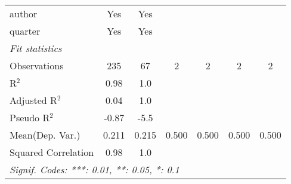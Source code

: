 \begin{tabular}{lcccccc}
   author                        & Yes           & Yes            &     &     &     & \\  
   quarter                       & Yes           & Yes            &     &     &     & \\  
   \midrule
   \emph{Fit statistics}\\
   Observations                  & 235           & 67             & 2   & 2   & 2   & 2\\  
   R$^2$                         & 0.98          & 1.0            &     &     &     & \\  
   Adjusted R$^2$                & 0.04          & 1.0            &     &     &     & \\  
   Pseudo R$^2$                  & -0.87         & -5.5           &     &     &     & \\  
Mean(Dep. Var.) & 0.211 & 0.215 & 0.500 & 0.500 & 0.500 & 0.500 \\
   Squared Correlation           & 0.98          & 1.0            &     &     &     & \\  
   \midrule \midrule
   \multicolumn{7}{l}{\emph{Signif. Codes: ***: 0.01, **: 0.05, *: 0.1}}\\
\end{tabular}
\par\endgroup
